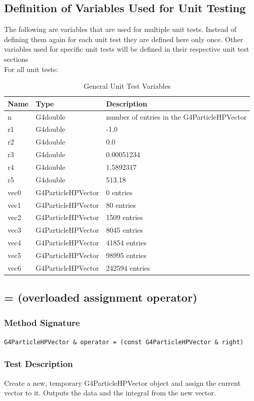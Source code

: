 \documentclass[12pt]{article}
\begin{document}
\subsection{Definition of Variables Used for Unit Testing}
The following are variables that are used for multiple unit tests. Instead of defining them again for each unit test they are defined here only once. Other variables used for specific unit tests will be defined in their respective unit test sections\\
For all unit tests:
\begin{table}[H]
\centering
\caption{General Unit Test Variables}\label{gen_var_table}
\begin{tabular}{lll}
\toprule
	\bf Name & \bf Type & \bf Description\\\midrule
	n 	& G4double 			& number of entries in the G4ParticleHPVector\\
	r1 	& G4double 			& -1.0\\
	r2	& G4double			& 0.0\\
	r3 	& G4double 			& 0.00051234\\
	r4 	& G4double 			& 1.5892317\\
	r5 	& G4double 			& 513.18\\
	vec0 & G4ParticleHPVector 	& 0 entries\\
	vec1 & G4ParticleHPVector	& 80 entries\\
	vec2 & G4ParticleHPVector 	& 1509 entries\\
	vec3 & G4ParticleHPVector 	& 8045 entries\\
	vec4 & G4ParticleHPVector 	& 41854 entries\\
	vec5 & G4ParticleHPVector 	& 98995 entries\\
	vec6 & G4ParticleHPVector 	& 242594 entries\\
\bottomrule		
\end{tabular}
\end{table}

\subsection{= (overloaded assignment operator)}
	\subsubsection{Method Signature}
	\texttt{G4ParticleHPVector \& operator = (const G4ParticleHPVector \& right)}
	
	\subsubsection{Test Description}
	Create a new, temporary G4ParticleHPVector object and assign the current vector to it. Outputs the data and the integral from the new vector.
\end{document}
